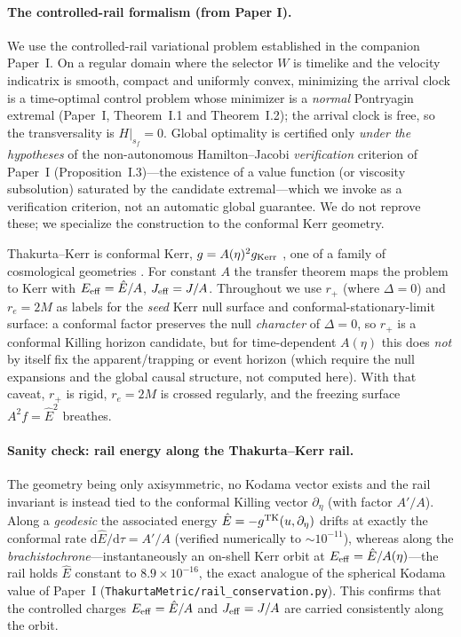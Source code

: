 \documentclass[12pt]{iopart}
\theoremstyle{plain}
\theoremstyle{definition}
\theoremstyle{remark}
\newcommand{\Ehat}{\hat E}
\newcommand{\rp}{r_{+}}
\newcommand{\re}{r_{e}}
\newcommand{\dd}{\mathrm{d}}
\begin{document}
\paragraph{The controlled-rail formalism (from Paper I).} We use the controlled-rail
variational problem established in the companion Paper~I. On a regular domain where the
selector $W$ is timelike and the velocity indicatrix is smooth, compact and uniformly
convex, minimizing the arrival clock is a time-optimal control problem whose minimizer is
a \emph{normal} Pontryagin extremal (Paper~I, Theorem~I.1 and Theorem~I.2); the arrival
clock is free, so the transversality is $H|_{s_f}=0$. Global optimality is certified only
\emph{under the hypotheses} of the non-autonomous Hamilton--Jacobi \emph{verification}
criterion of Paper~I (Proposition~I.3)---the existence of a value function (or viscosity
subsolution) saturated by the candidate extremal---which we invoke as a verification
criterion, not an automatic global guarantee. We do not reprove these; we specialize the
construction to the conformal Kerr geometry.

Thakurta--Kerr is conformal Kerr, $g=A(\eta)^2 g_{\rm Kerr}$
\cite{Thakurta1981,Kerr1963}, one of a family of cosmological geometries
\cite{McVittie1933,SultanaDyer2005,Kaloper2010,NolanMcVittie1998,MelloMaciel2017,FaraoniBook}.
For constant $A$
the transfer theorem maps the problem to Kerr with $E_{\rm eff}=\Ehat/A$,
$J_{\rm eff}=J/A$. Throughout we use $\rp$ (where $\Delta=0$) and $\re=2M$ as
labels for the \emph{seed} Kerr null surface and conformal-stationary-limit surface:
a conformal factor preserves the null \emph{character} of $\Delta=0$, so $\rp$ is a
conformal Killing horizon candidate, but for time-dependent $A(\eta)$ this does
\emph{not} by itself fix the apparent/trapping or event horizon (which require the
null expansions and the global causal structure, not computed here). With that
caveat, $\rp$ is rigid, $\re=2M$ is crossed regularly, and the freezing surface
$A^2 f=\Ehat^2$ breathes.

\paragraph{Sanity check: rail energy along the Thakurta--Kerr rail.} The geometry being
only axisymmetric, no Kodama vector exists and the rail invariant is instead tied to the
conformal Killing vector $\partial_\eta$ (with factor $A'/A$). Along a \emph{geodesic} the
associated energy $\Ehat=-g^{\rm TK}(u,\partial_\eta)$ drifts at exactly the conformal
rate $\dd\Ehat/\dd\tau=A'/A$ (verified numerically to $\sim\!10^{-11}$), whereas along the
\emph{brachistochrone}---instantaneously an on-shell Kerr orbit at
$E_{\rm eff}=\Ehat/A(\eta)$---the rail holds $\Ehat$ constant to $8.9\times10^{-16}$, the
exact analogue of the spherical Kodama value of Paper~I
(\texttt{ThakurtaMetric/rail\_conservation.py}). This confirms that the controlled charges
$E_{\rm eff}=\Ehat/A$ and $J_{\rm eff}=J/A$ are carried consistently along the orbit.
\end{document}
